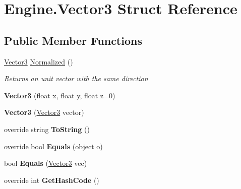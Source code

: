 \hypertarget{struct_engine_1_1_vector3}{\section{Engine.\-Vector3 Struct Reference}
\label{struct_engine_1_1_vector3}
}
\subsection*{Public Member Functions}
\begin{DoxyCompactItemize}
\item 
\hyperlink{struct_engine_1_1_vector3}{Vector3} \hyperlink{struct_engine_1_1_vector3_a5f18f617f61735ecfddf72d36ec6c93f}{Normalized} ()
\begin{DoxyCompactList}\small\item\em Returns an unit vector with the same direction \end{DoxyCompactList}\item 
\hypertarget{struct_engine_1_1_vector3_ad35876a556e08cc6e5e5b4da8f08daec}{{\bfseries Vector3} (float x, float y, float z=0)}\label{struct_engine_1_1_vector3_ad35876a556e08cc6e5e5b4da8f08daec}

\item 
\hypertarget{struct_engine_1_1_vector3_a044d0c4977cfb05dce39a5a49493ea0e}{{\bfseries Vector3} (\hyperlink{struct_engine_1_1_vector3}{Vector3} vector)}\label{struct_engine_1_1_vector3_a044d0c4977cfb05dce39a5a49493ea0e}

\item 
\hypertarget{struct_engine_1_1_vector3_a647d8c54744dfcdd050bbd72f5db64d2}{override string {\bfseries To\-String} ()}\label{struct_engine_1_1_vector3_a647d8c54744dfcdd050bbd72f5db64d2}

\item 
\hypertarget{struct_engine_1_1_vector3_a72595704f4917cbf1154449af198a1c4}{override bool {\bfseries Equals} (object o)}\label{struct_engine_1_1_vector3_a72595704f4917cbf1154449af198a1c4}

\item 
\hypertarget{struct_engine_1_1_vector3_ac403690f561729d843006f071c5132e8}{bool {\bfseries Equals} (\hyperlink{struct_engine_1_1_vector3}{Vector3} vec)}\label{struct_engine_1_1_vector3_ac403690f561729d843006f071c5132e8}

\item 
\hypertarget{struct_engine_1_1_vector3_aedfdff3cff31dc13f03f9d8595c9cf65}{override int {\bfseries Get\-Hash\-Code} ()}\label{struct_engine_1_1_vector3_aedfdff3cff31dc13f03f9d8595c9cf65}


\end{DoxyCompactItemize}
